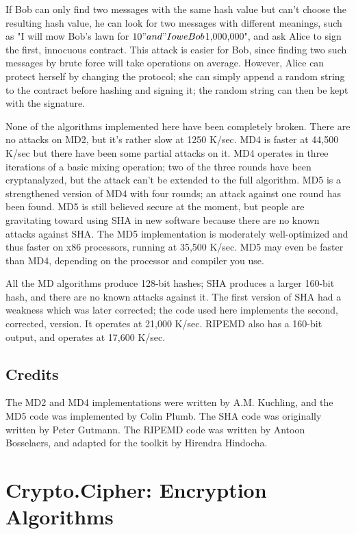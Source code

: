 \documentclass{howto}
\begin{document}
If Bob can only find two messages with the same hash value but can't
choose the resulting hash value, he can look for two messages with
different meanings, such as "I will mow Bob's lawn for $10" and "I owe
Bob $1,000,000", and ask Alice to sign the first, innocuous contract.
This attack is easier for Bob, since finding two such messages by brute
force will take  operations on average.  However,
Alice can protect herself by changing the protocol; she can simply
append a random string to the contract before hashing and signing it;
the random string can then be kept with the signature.

None of the algorithms implemented here have been completely broken.
There are no attacks on MD2, but it's rather slow at 1250 K/sec.  MD4
is faster at 44,500 K/sec but there have been some partial attacks on
it.  MD4 operates in three iterations of a basic mixing operation; two
of the three rounds have been cryptanalyzed, but the attack can't be
extended to the full algorithm.  MD5 is a strengthened version of MD4
with four rounds; an attack against one round has been found.  MD5 is
still believed secure at the moment, but people are gravitating toward
using SHA in new software because there are no known attacks against
SHA.  The MD5 implementation is moderately well-optimized and thus
faster on x86 processors, running at 35,500 K/sec.  MD5 may even be
faster than MD4, depending on the processor and compiler you use.

All the MD algorithms produce 128-bit hashes; SHA produces a
larger 160-bit hash, and there are no known attacks against it.  The
first version of SHA had a weakness which was later corrected; the
code used here implements the second, corrected, version.  It operates
at 21,000 K/sec.  RIPEMD also has a 160-bit output, and operates at
17,600 K/sec.

\subsection{Credits}
The MD2 and  MD4 implementations were written by A.M. Kuchling,
and the MD5 code was implemented by Colin Plumb.  The SHA code was
originally written by Peter Gutmann.  The RIPEMD code was written by
Antoon Bosselaers, and adapted for the toolkit by Hirendra Hindocha.

\section{Crypto.Cipher: Encryption Algorithms}
\end{document}
